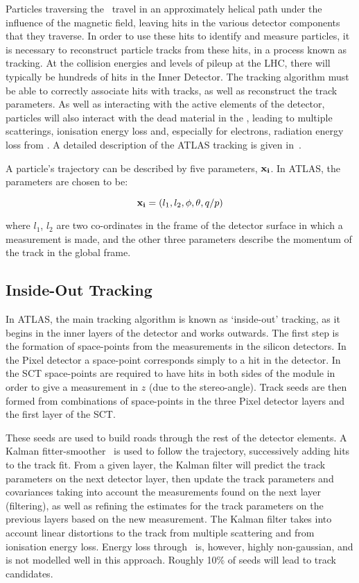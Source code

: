 Particles traversing the \id\ travel in an approximately helical path
under the influence of the magnetic field, leaving hits in the various detector
components that they traverse. In order to use these hits to identify and
measure particles, it is necessary to reconstruct particle tracks from these
hits, in a process known as tracking. At the collision energies and levels of
pileup at the LHC, there will typically be hundreds of hits in the Inner
Detector. The tracking algorithm must be able to correctly associate hits with
tracks, as well as reconstruct the track parameters. As well as interacting with
the active elements of the detector, particles will also interact with the dead
material in the \id, leading to multiple scatterings, ionisation
energy loss and, especially for electrons, radiation energy loss from
\brem. A detailed description of the ATLAS tracking is given
in~\cite{1742-6596-119-3-032014}.

A particle's trajectory can be described by five parameters, $\bf{x_{i}}$. In
ATLAS, the parameters are chosen to be:

\begin{equation} {\bf x_{i}} = (l_{1}, l_{2}, \phi, \theta, q/p) \end{equation}

where $l_{1}$, $l_{2}$ are two co-ordinates in the frame of the detector surface
in which a measurement is made, and the other three parameters describe the momentum of the
track in the global frame.

\subsection{Inside-Out Tracking} \label{sec:tracking-std}

In ATLAS, the main tracking algorithm is known as `inside-out' tracking, as it
begins in the inner layers of the detector and works outwards. The first step is
the formation of space-points from the measurements in the silicon detectors. In
the Pixel detector a space-point corresponds simply to a hit in the detector. In
the SCT space-points are required to have hits in both sides of the module in
order to give a measurement in $z$ (due to the stereo-angle). Track seeds are
then formed from combinations of space-points in the three Pixel detector layers
and the first layer of the SCT. 

These seeds are used to build roads through the rest of the detector elements. A
Kalman fitter-smoother~\cite{Fruhwirth:1987fm} is used to follow the trajectory,
successively adding hits to the track fit. From a given layer, the Kalman filter
will predict the track parameters on the next detector layer, then update the
track parameters and covariances taking into account the measurements found on
the next layer (filtering), as well as refining the estimates for the track
parameters on the previous layers based on the new measurement. The Kalman
filter takes into account linear distortions to the track from multiple
scattering and from ionisation energy loss. Energy loss through \brem\ 
is, however, highly non-gaussian, and is not modelled well in this approach.
Roughly 10\% of seeds will lead to track candidates.

